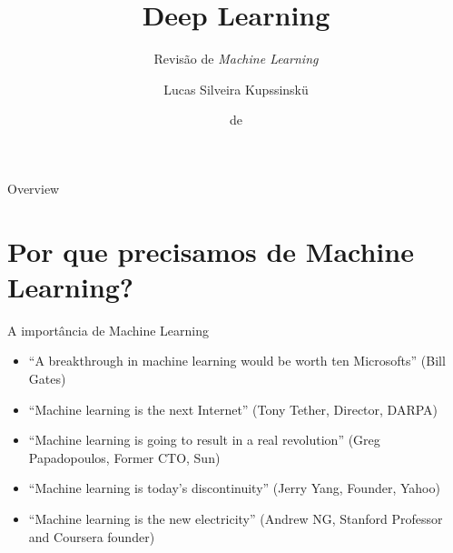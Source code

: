 \documentclass[aspectratio=169,xcolor=dvipsnames]{beamer}
\title{Deep Learning}
\subtitle{Revisão de \textit{Machine Learning}}
\author{Lucas Silveira Kupssinskü}
\institute
{
    Machine Learning Theory and Applications Laboratory \\
    PUCRS %
}
\date{\mespor de \the\year}
\begin{document}
\begin{frame}
    \titlepage
\end{frame}

\begin{frame}{Overview}
    \tableofcontents
\end{frame}

\section{Por que precisamos de Machine Learning?}

\begin{frame}{A importância de Machine Learning}

\begin{itemize}
    \item ``A breakthrough in machine learning would be worth ten Microsofts'' (Bill Gates)
    \item ``Machine learning is the next Internet'' (Tony Tether, Director, DARPA)
    \item ``Machine learning is going to result in a real revolution'' (Greg Papadopoulos, Former CTO, Sun)
    \item ``Machine learning is today’s discontinuity'' (Jerry Yang, Founder, Yahoo)
    \item ``Machine learning is the new electricity'' (Andrew NG, Stanford Professor and Coursera founder)
\end{itemize}
\end{frame}
\end{document}

